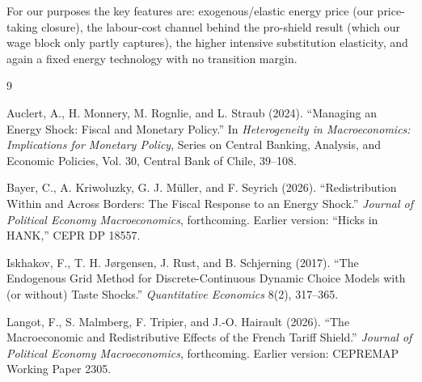 \documentclass[11pt,a4paper]{article}
\begin{document}
For our purposes the key features are: exogenous/elastic energy price (our
price-taking closure), the labour-cost channel behind the pro-shield result
(which our wage block only partly captures), the higher intensive substitution
elasticity, and again a fixed energy technology with no transition margin.

\begin{thebibliography}{9}

Auclert, A., H. Monnery, M. Rognlie, and L. Straub (2024).
``Managing an Energy Shock: Fiscal and Monetary Policy.''
In \emph{Heterogeneity in Macroeconomics: Implications for Monetary Policy},
Series on Central Banking, Analysis, and Economic Policies, Vol. 30,
Central Bank of Chile, 39--108.

Bayer, C., A. Kriwoluzky, G. J. M\"uller, and F. Seyrich (2026).
``Redistribution Within and Across Borders: The Fiscal Response to an Energy
Shock.'' \emph{Journal of Political Economy Macroeconomics}, forthcoming.
Earlier version: ``Hicks in HANK,'' CEPR DP 18557.

Iskhakov, F., T. H. J{\o}rgensen, J. Rust, and B. Schjerning (2017).
``The Endogenous Grid Method for Discrete-Continuous Dynamic Choice Models with
(or without) Taste Shocks.'' \emph{Quantitative Economics} 8(2), 317--365.

Langot, F., S. Malmberg, F. Tripier, and J.-O. Hairault (2026).
``The Macroeconomic and Redistributive Effects of the French Tariff Shield.''
\emph{Journal of Political Economy Macroeconomics}, forthcoming.
Earlier version: CEPREMAP Working Paper 2305.

\end{thebibliography}
\end{document}
